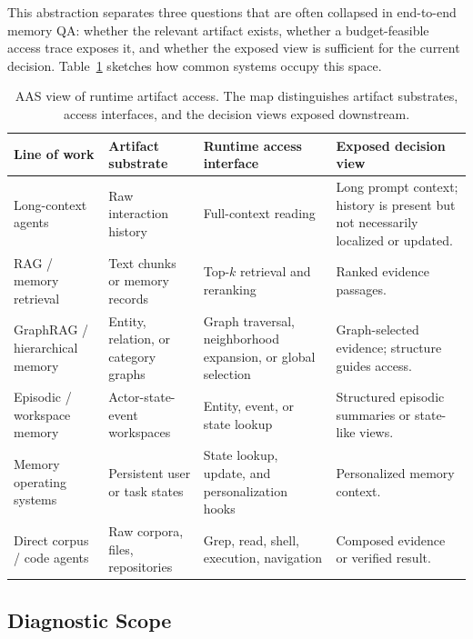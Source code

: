 This abstraction separates three questions that are often collapsed in end-to-end memory QA: whether the relevant artifact exists, whether a budget-feasible access trace exposes it, and whether the exposed view is sufficient for the current decision.
Table~\ref{tab:aas-system-map} sketches how common systems occupy this space.

\begin{table}[t]
\centering
\footnotesize
\setlength{\tabcolsep}{3.5pt}
\begin{tabularx}{\textwidth}{
>{\raggedright\arraybackslash}p{}
>{\raggedright\arraybackslash}p{}
>{\raggedright\arraybackslash}p{}
>{\raggedright\arraybackslash}X}
\toprule
Line of work & Artifact substrate & Runtime access interface & Exposed decision view \\
\midrule
Long-context agents
& Raw interaction history
& Full-context reading
& Long prompt context; history is present but not necessarily localized or updated. \\
RAG / memory retrieval
& Text chunks or memory records
& Top-$k$ retrieval and reranking
& Ranked evidence passages. \\
GraphRAG / hierarchical memory
& Entity, relation, or category graphs
& Graph traversal, neighborhood expansion, or global selection
& Graph-selected evidence; structure guides access. \\
Episodic / workspace memory
& Actor-state-event workspaces
& Entity, event, or state lookup
& Structured episodic summaries or state-like views. \\
Memory operating systems
& Persistent user or task states
& State lookup, update, and personalization hooks
& Personalized memory context. \\
Direct corpus / code agents
& Raw corpora, files, repositories
& Grep, read, shell, execution, navigation
& Composed evidence or verified result. \\
\bottomrule
\end{tabularx}
\caption{AAS view of runtime artifact access. The map distinguishes artifact substrates, access interfaces, and the decision views exposed downstream.}
\label{tab:aas-system-map}
\end{table}

\subsection{Diagnostic Scope}
\label{subsec:aas-scope}

